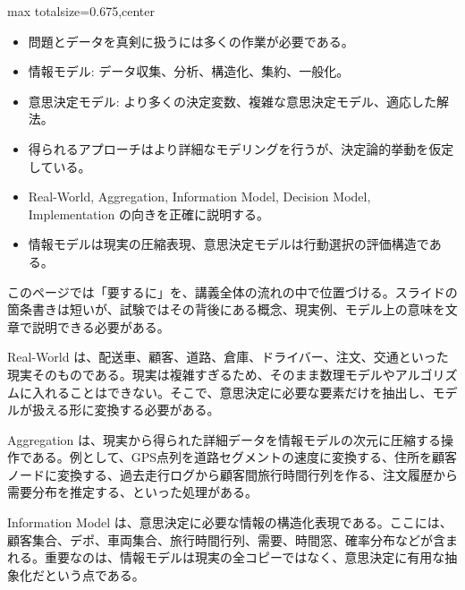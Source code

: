 \clearpage
{}
\begin{adjustbox}{max totalsize={\textwidth}{0.675\textheight},center}
\begin{minipage}{\textwidth}\scriptsize
\begin{minipage}[t]{0.485\textwidth}
\begin{itemize}
\item 問題とデータを真剣に扱うには多くの作業が必要である。
\item 情報モデル: データ収集、分析、構造化、集約、一般化。
\item 意思決定モデル: より多くの決定変数、複雑な意思決定モデル、適応した解法。
\item 得られるアプローチはより詳細なモデリングを行うが、決定論的挙動を仮定している。
\end{itemize}
\begin{itemize}
\item Real-World, Aggregation, Information Model, Decision Model, Implementation の向きを正確に説明する。
\item 情報モデルは現実の圧縮表現、意思決定モデルは行動選択の評価構造である。
\end{itemize}
\end{minipage}\hfill
\begin{minipage}[t]{0.485\textwidth}
このページでは「要するに」を、講義全体の流れの中で位置づける。スライドの箇条書きは短いが、試験ではその背後にある概念、現実例、モデル上の意味を文章で説明できる必要がある。\par
Real-World は、配送車、顧客、道路、倉庫、ドライバー、注文、交通といった現実そのものである。現実は複雑すぎるため、そのまま数理モデルやアルゴリズムに入れることはできない。そこで、意思決定に必要な要素だけを抽出し、モデルが扱える形に変換する必要がある。\par
Aggregation は、現実から得られた詳細データを情報モデルの次元に圧縮する操作である。例として、GPS点列を道路セグメントの速度に変換する、住所を顧客ノードに変換する、過去走行ログから顧客間旅行時間行列を作る、注文履歴から需要分布を推定する、といった処理がある。\par
Information Model は、意思決定に必要な情報の構造化表現である。ここには、顧客集合、デポ、車両集合、旅行時間行列、需要、時間窓、確率分布などが含まれる。重要なのは、情報モデルは現実の全コピーではなく、意思決定に有用な抽象化だという点である。\par

\end{minipage}
\end{minipage}
\end{adjustbox}
